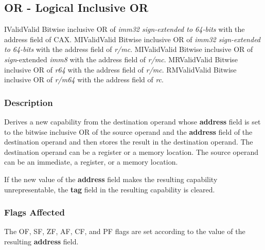 \clearpage
{}
{}
\subsection*{OR - Logical Inclusive OR}

\begin{x86opcodetable}
  {I}{Valid}{Valid}
  {Bitwise inclusive OR of \emph{imm32 sign-extended to 64-bits} with
    the address field of CAX.}
  {MI}{Valid}{Valid}
  {Bitwise inclusive OR of \emph{imm32 sign-extended to 64-bits} with
    the address field of \emph{r/mc}.}
  {MI}{Valid}{Valid}
  {Bitwise inclusive OR of \emph{sign}-extended \emph{imm8} with the
    address field of \emph{r/mc}.}
  {MR}{Valid}{Valid}
  {Bitwise inclusive OR of \emph{r64} with the address field of
    \emph{r/mc}.}
  {RM}{Valid}{Valid}
  {Bitwise inclusive OR of \emph{r/m64} with the address field of
    \emph{rc}.}
\end{x86opcodetable}

\begin{x86opentable}
\end{x86opentable}

\subsubsection*{Description}

Derives a new capability from the destination operand whose
\textbf{address} field is set to the bitwise inclusive OR of the
source operand and the \textbf{address} field of the destination
operand and then stores the result in the destination operand. The
destination operand can be a register or a memory location. The source
operand can be an immediate, a register, or a memory location.

If the new value of the \textbf{address} field makes the resulting
capability unrepresentable, the \textbf{tag} field in the resulting
capability is cleared.

\subsubsection*{Flags Affected}

The OF, SF, ZF, AF, CF, and PF flags are set according to the value of
the resulting \textbf{address} field.
